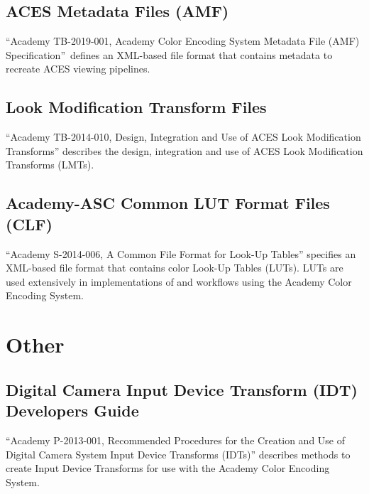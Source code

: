 \subsection{ACES Metadata Files (AMF)}
``Academy TB-2019-001, Academy Color Encoding System Metadata File (AMF) Specification'' defines an XML-based file format that contains metadata to recreate ACES viewing pipelines.

\subsection{Look Modification Transform Files}
``Academy TB-2014-010, Design, Integration and Use of ACES Look Modification Transforms'' describes the design, integration and use of ACES Look Modification Transforms (LMTs).

\subsection{Academy-ASC Common LUT Format Files (CLF)}
``Academy S-2014-006, A Common File Format for Look-Up Tables'' specifies an XML-based file format that contains color Look-Up Tables (LUTs). LUTs are used extensively in implementations of and workflows using the Academy Color Encoding System.


\section{Other}
\subsection{Digital Camera Input Device Transform (IDT) Developers Guide}
``Academy P-2013-001, Recommended Procedures for the Creation and Use of Digital Camera System Input Device Transforms (IDTs)'' describes methods to create Input Device Transforms for use with the Academy Color Encoding System.